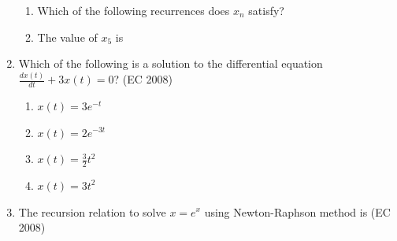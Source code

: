 \begin{enumerate}[label=\thesubsection.\arabic*,ref=\thesubsection.\theenumi]
\begin{enumerate} 
\item Which of the following recurrences does $x_n$ satisfy? 
\begin{enumerate} 
\end{enumerate}
%
\item The value of $x_5$ is
\begin{enumerate} 
\end{enumerate}
\end{enumerate}
\item Which of the following is a solution to the differential equation $\frac{dx(t)}{dt} + 3x(t) = 0$?
\hfill (EC 2008)
\begin{multicols}{4}
    \begin{enumerate}
        \item $x(t) = 3e^{-t}$
        \item $x(t) = 2e^{-3t}$
        \item $x(t) = \frac{3}{2} t^2$
        \item $x(t) = 3t^2$
    \end{enumerate}
\end{multicols}
\item The recursion relation to solve $x = e^{x}$ using Newton-Raphson method is
\hfill (EC 2008)
\begin{enumerate}
\end{enumerate}
\end{enumerate}
